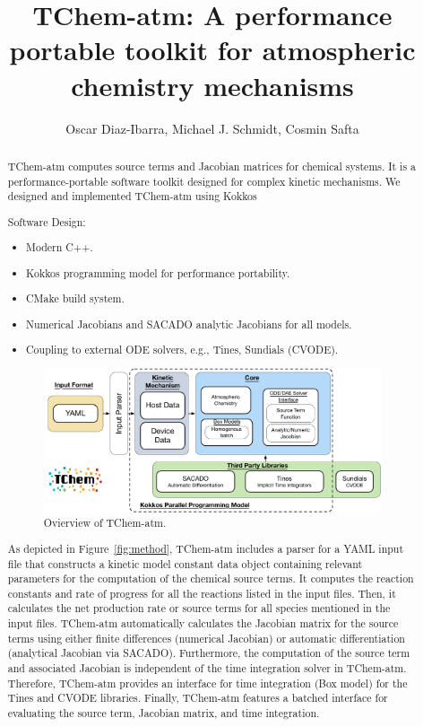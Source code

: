 \documentclass[report, 12pt]{SANDreport}
\title{TChem-atm: A performance portable toolkit for atmospheric chemistry mechanisms}
\author{Oscar Diaz-Ibarra, Michael J. Schmidt, Cosmin Safta}
\date{}
\begin{document}
    \maketitle
\justifying

    \begin{abstract}
TChem-atm computes source terms and Jacobian matrices for chemical systems. It is a performance-portable software toolkit designed for complex kinetic mechanisms. We designed and implemented TChem-atm using Kokkos~\cite{kokkosweb,Carter:2014,Trott:2021:kokkos,Trott:2022:kokkos}

Software Design:
\begin{itemize}
  \item Modern C++.
  \item Kokkos programming model for performance portability.
  \item CMake build system.
  \item Numerical Jacobians and SACADO analytic Jacobians for all models.
  \item Coupling to external ODE solvers, e.g., Tines, Sundials (CVODE).
\end{itemize}

\begin{figure}[htp]
  \centering
  \includegraphics[width=1\textwidth]{figures/TChem_atm.pdf}
  \caption{Ovierview of TChem-atm.}
\label{fig:method}
\end{figure}

As depicted in Figure~\ref{fig:method}, TChem-atm includes a parser for a YAML input file that constructs a kinetic model constant data object containing relevant parameters for the computation of the chemical source terms. It computes the reaction constants and rate of progress for all the reactions listed in the input files. Then, it calculates the net production rate or source terms for all species mentioned in the input files. TChem-atm automatically calculates the Jacobian matrix for the source terms using either finite differences (numerical Jacobian) or automatic differentiation (analytical Jacobian via SACADO). Furthermore, the computation of the source term and associated Jacobian is independent of the time integration solver in TChem-atm. Therefore, TChem-atm provides an interface for time integration (Box model) for the Tines and CVODE libraries. Finally, TChem-atm features a batched interface for evaluating the source term, Jacobian matrix, and time integration.

\end{abstract}
\end{document}
